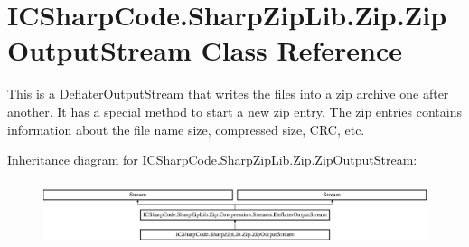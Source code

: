 \hypertarget{class_i_c_sharp_code_1_1_sharp_zip_lib_1_1_zip_1_1_zip_output_stream}{}\section{I\+C\+Sharp\+Code.\+Sharp\+Zip\+Lib.\+Zip.\+Zip\+Output\+Stream Class Reference}
\label{class_i_c_sharp_code_1_1_sharp_zip_lib_1_1_zip_1_1_zip_output_stream}


This is a Deflater\+Output\+Stream that writes the files into a zip archive one after another. It has a special method to start a new zip entry. The zip entries contains information about the file name size, compressed size, C\+RC, etc.  


Inheritance diagram for I\+C\+Sharp\+Code.\+Sharp\+Zip\+Lib.\+Zip.\+Zip\+Output\+Stream\+:\begin{figure}[H]
\begin{center}
\leavevmode
\includegraphics[height=1.891892cm]{class_i_c_sharp_code_1_1_sharp_zip_lib_1_1_zip_1_1_zip_output_stream}
\end{center}
\end{figure}
